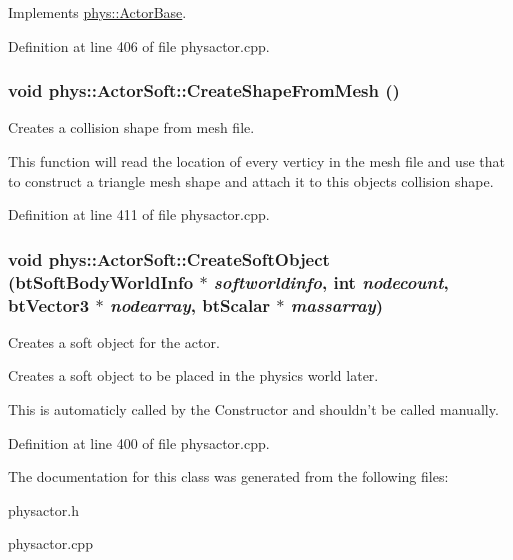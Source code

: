 Implements \hyperlink{classphys_1_1ActorBase_ac5d4ad5a634b16000742f506ed5957fb}{phys::ActorBase}.



Definition at line 406 of file physactor.cpp.

\hypertarget{classphys_1_1ActorSoft_a51d78e0f503c3c815511c3d246b426ae}{
\subsubsection[{CreateShapeFromMesh}]{\setlength{\rightskip}{0pt plus 5cm}void phys::ActorSoft::CreateShapeFromMesh ()}}
\label{d4/d23/classphys_1_1ActorSoft_a51d78e0f503c3c815511c3d246b426ae}


Creates a collision shape from mesh file. 

This function will read the location of every verticy in the mesh file and use that to construct a triangle mesh shape and attach it to this objects collision shape. 

Definition at line 411 of file physactor.cpp.

\hypertarget{classphys_1_1ActorSoft_a04c98bb0ab9ed7c1dfc3435d49403ef4}{
\subsubsection[{CreateSoftObject}]{\setlength{\rightskip}{0pt plus 5cm}void phys::ActorSoft::CreateSoftObject (btSoftBodyWorldInfo $\ast$ {\em softworldinfo}, \/  int {\em nodecount}, \/  btVector3 $\ast$ {\em nodearray}, \/  btScalar $\ast$ {\em massarray})}}
\label{d4/d23/classphys_1_1ActorSoft_a04c98bb0ab9ed7c1dfc3435d49403ef4}


Creates a soft object for the actor. 

Creates a soft object to be placed in the physics world later. \par
 This is automaticly called by the Constructor and shouldn't be called manually. 

Definition at line 400 of file physactor.cpp.



The documentation for this class was generated from the following files:\begin{DoxyCompactItemize}
\item 
physactor.h\item 
physactor.cpp\end{DoxyCompactItemize}
